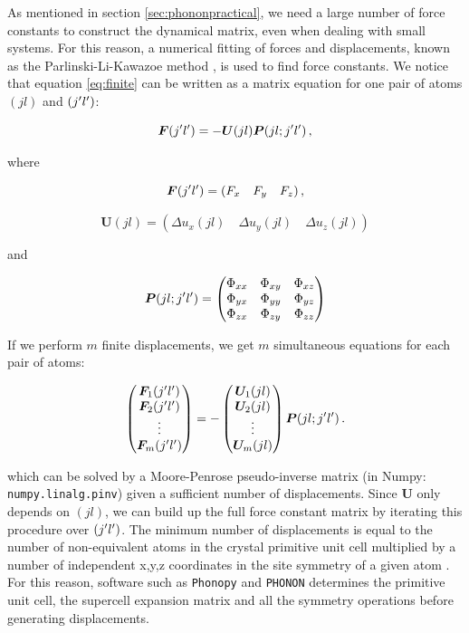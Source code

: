 As mentioned in section \ref{sec:phononpractical}, we need a large number of force constants to construct the dynamical matrix, even when dealing with small systems. For this reason, a numerical fitting of forces and displacements, known as the Parlinski-Li-Kawazoe method \cite{Parlinski1997}, is used to find force constants. We notice that equation \eqref{eq:finite} can be written as a matrix equation for one pair of atoms $(jl)$ and $(j^\prime l^\prime)$:

\[ \bm{F}(j^\prime l^\prime) = -\bm{U}(jl) \bm{P} (jl;j^\prime l^\prime) \, , \]

\noindent where

\[ \bm{F}(j^\prime l^\prime) = (F_x \quad F_y \quad F_z) \, , \]

\[ \bm{U}(jl) = \left( \Delta u_x(jl) \quad \Delta u_y(jl) \quad \Delta u_z(jl) \right)  \]

\noindent and

\[ 
\bm{P} (jl;j^\prime l^\prime) = 	
\begin{pmatrix}
\Phi_{xx} & \Phi_{xy} & \Phi_{xz} \\
\Phi_{yx} & \Phi_{yy} & \Phi_{yz} \\
\Phi_{zx} & \Phi_{zy} & \Phi_{zz} 
\end{pmatrix}
\]

\noindent If we perform $m$ finite displacements, we get $m$ simultaneous equations for each pair of atoms:

\begin{equation*}
\begin{pmatrix} \bm{F}_1(j^\prime l^\prime) \\ \bm{F}_2(j^\prime l^\prime) \\ \vdots \\ \bm{F}_m(j^\prime l^\prime) \end{pmatrix} =
- \begin{pmatrix} \bm{U}_1(jl) \\ \bm{U}_2(jl) \\ \vdots \\ \bm{U}_m(jl) \end{pmatrix} \bm{P}(jl;j^\prime l^\prime) \, .
\end{equation*}

\noindent which can be solved by a Moore-Penrose pseudo-inverse matrix (in Numpy: \texttt{numpy.linalg.pinv}) given a sufficient number of displacements. Since $\bm{U}$ only depends on $(jl)$, we can build up the full force constant matrix by iterating this procedure over $(j^\prime l^\prime)$. The minimum number of displacements is equal to the number of non-equivalent atoms in the crystal primitive unit cell multiplied by a number of independent x,y,z coordinates in the site symmetry of a given atom \cite{Parlinski1997}. For this reason, software such as \texttt{Phonopy} and \texttt{PHONON} determines the primitive unit cell, the supercell expansion matrix and all the symmetry operations before generating displacements.

